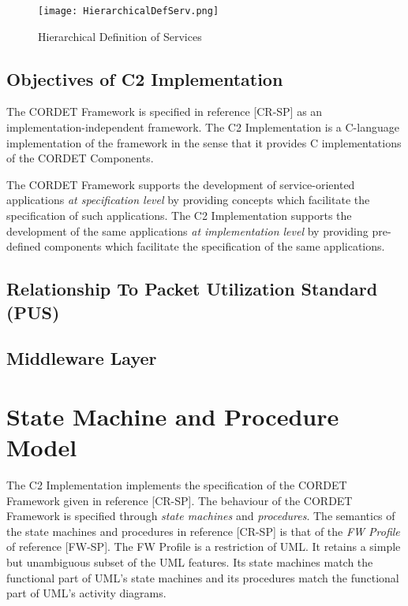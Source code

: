 \documentclass{pnp_article}
\begin{document}
\begin{figure}[ht]
 \centering
 \texttt{[image: HierarchicalDefServ.png]}
 \caption{Hierarchical Definition of Services}
 \label{fig:HierarchicalDefServ}
\end{figure}

\subsection{Objectives of C2 Implementation}\label{sec:ObjectivesC2Impl} 

The CORDET Framework is specified in reference [CR-SP] as an implementation-independent framework.
The C2 Implementation is a C-language implementation of the framework in the sense that it provides C implementations of the CORDET Components.

The CORDET Framework supports the development of service-oriented applications \textit{at specification level} by providing concepts which facilitate the specification of such applications.
The C2 Implementation supports the development of the same applications \textit{at implementation level} by providing pre-defined components which facilitate the specification of the same applications.

\subsection{Relationship To Packet Utilization Standard (PUS)}\label{sec:RelationshipToPUS}


\subsection{Middleware Layer}\label{sec:MwLayer} 


\section{State Machine and Procedure Model}\label{sec:SmAndPrModel}
The C2 Implementation implements the specification of the CORDET Framework given in reference [CR-SP]. The behaviour of the CORDET Framework is specified through \textit{state machines} and \textit{procedures}. The semantics of the state machines and procedures in reference [CR-SP] is that of the \textit{FW Profile} of reference [FW-SP]. The FW Profile is a restriction of UML. It retains a simple but unambiguous subset of the UML features. Its state machines match the functional part of UML's state machines and its procedures match the functional part of UML's activity diagrams. 
\end{document}
